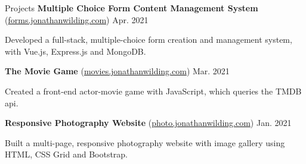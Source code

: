 \documentclass{resume} %
\begin{document}
\begin{rSection}{Projects}
    \textbf{Multiple Choice Form Content Management System}
    (\href{https://forms.jonathanwilding.com}{forms.jonathanwilding.com}) \hfill{Apr. 2021}
    \begin{compactitem}
        \item Developed a full-stack, multiple-choice form creation and management system, with
            Vue.js, Express.js and MongoDB.
    \end{compactitem}
    \textbf{The Movie Game} (\href{https://movies.jonathanwilding.com}{movies.jonathanwilding.com}) \hfill{Mar. 2021}
    \begin{compactitem}
        \item Created a front-end actor-movie game with JavaScript, which queries the TMDB api.
    \end{compactitem}
    \textbf{Responsive Photography Website} (\href{https://photo.jonathanwilding.com}{photo.jonathanwilding.com}) \hfill{Jan. 2021}
    \begin{compactitem}
        \item Built a multi-page, responsive photography website with image gallery using HTML, CSS Grid and
            Bootstrap.
    \end{compactitem}
\end{rSection}
\end{document}
